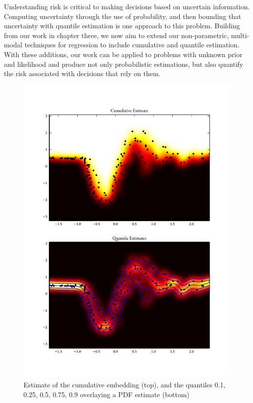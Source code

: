 \documentclass[twoside]{article} \usepackage{aistats2017}
\theoremstyle{definition}
\theoremstyle{remark}
\begin{document}
	Understanding risk is critical to making decisions based on uncertain information. Computing uncertainty through the use of probability, and then bounding that uncertainty with quantile estimation is one approach to this problem. Building from our work in chapter three, we now aim to extend our non-parametric, multi-modal techniques for regression to include cumulative and quantile estimation. With these additions, our work can be applied to problems with unknown prior and likelihood and produce not only probabilistic estimations, but also quantify the risk associated with decisions that rely on them.
	
	\begin{figure}
		\begin{center}
			\includegraphics[width=\columnwidth]{figures/mcquantiles}
		\end{center}
		\caption{\small Estimate of the cumulative embedding (top),
			and the quantiles 0.1, 0.25, 0.5, 0.75, 0.9 overlaying a PDF estimate
			(bottom)}
		\label{fig:cembedding}
	\end{figure}
\end{document}
